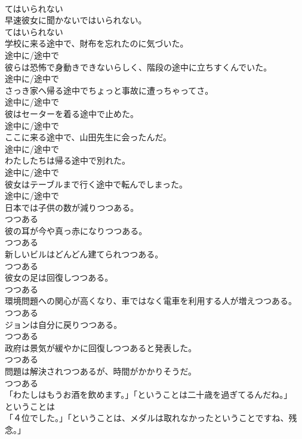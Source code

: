 \documentclass[8pt]{extreport}
\begin{document}
\begin{CJK}{UTF8}{min}
\\	てはいられない
\\	早速彼女に聞かないではいられない。	
\\	てはいられない
\\	学校に来る途中で、財布を忘れたのに気づいた。	
\\	途中に/途中で
\\	彼らは恐怖で身動きできないらしく、階段の途中に立ちすくんでいた。	
\\	途中に/途中で
\\	さっき家へ帰る途中でちょっと事故に遭っちゃってさ。	
\\	途中に/途中で
\\	彼はセーターを着る途中で止めた。	
\\	途中に/途中で
\\	ここに来る途中で、山田先生に会ったんだ。	
\\	途中に/途中で
\\	わたしたちは帰る途中で別れた。	
\\	途中に/途中で
\\	彼女はテーブルまで行く途中で転んでしまった。	
\\	途中に/途中で
\\	日本では子供の数が減りつつある。	
\\	つつある
\\	彼の耳が今や真っ赤になりつつある。	
\\	つつある
\\	新しいビルはどんどん建てられつつある。	
\\	つつある
\\	彼女の足は回復しつつある。	
\\	つつある
\\	環境問題への関心が高くなり、車ではなく電車を利用する人が増えつつある。	
\\	つつある
\\	ジョンは自分に戻りつつある。	
\\	つつある
\\	政府は景気が緩やかに回復しつつあると発表した。	
\\	つつある
\\	問題は解決されつつあるが、時間がかかりそうだ。	
\\	つつある
\\	「わたしはもうお酒を飲めます。」「ということは二十歳を過ぎてるんだね。」	
\\	ということは
\\	「４位でした。」「ということは、メダルは取れなかったということですね、残念。」	

\end{CJK}
\end{document}
